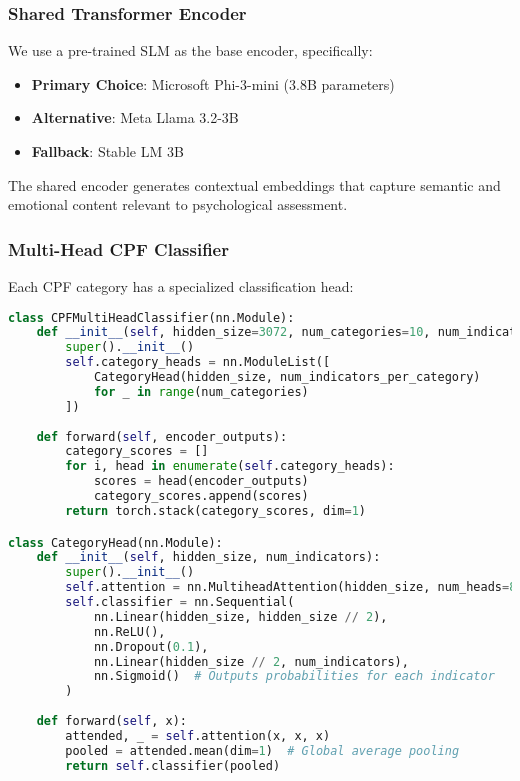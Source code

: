 \documentclass[11pt,a4paper]{article}
\begin{document}
\subsubsection{Shared Transformer Encoder}

We use a pre-trained SLM as the base encoder, specifically:
\begin{itemize}
\item \textbf{Primary Choice}: Microsoft Phi-3-mini (3.8B parameters)
\item \textbf{Alternative}: Meta Llama 3.2-3B
\item \textbf{Fallback}: Stable LM 3B
\end{itemize}

The shared encoder generates contextual embeddings that capture semantic and emotional content relevant to psychological assessment.

\subsubsection{Multi-Head CPF Classifier}

Each CPF category has a specialized classification head:

\begin{lstlisting}[language=Python, caption=Multi-Head Classifier]
class CPFMultiHeadClassifier(nn.Module):
    def __init__(self, hidden_size=3072, num_categories=10, num_indicators_per_category=10):
        super().__init__()
        self.category_heads = nn.ModuleList([
            CategoryHead(hidden_size, num_indicators_per_category) 
            for _ in range(num_categories)
        ])
        
    def forward(self, encoder_outputs):
        category_scores = []
        for i, head in enumerate(self.category_heads):
            scores = head(encoder_outputs)
            category_scores.append(scores)
        return torch.stack(category_scores, dim=1)

class CategoryHead(nn.Module):
    def __init__(self, hidden_size, num_indicators):
        super().__init__()
        self.attention = nn.MultiheadAttention(hidden_size, num_heads=8)
        self.classifier = nn.Sequential(
            nn.Linear(hidden_size, hidden_size // 2),
            nn.ReLU(),
            nn.Dropout(0.1),
            nn.Linear(hidden_size // 2, num_indicators),
            nn.Sigmoid()  # Outputs probabilities for each indicator
        )
        
    def forward(self, x):
        attended, _ = self.attention(x, x, x)
        pooled = attended.mean(dim=1)  # Global average pooling
        return self.classifier(pooled)
\end{lstlisting}
\end{document}

